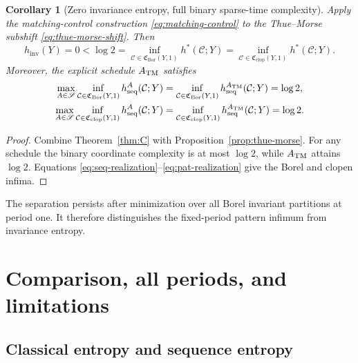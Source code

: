 \documentclass[11pt,reqno]{amsart}
\numberwithin{equation}{section}
\newtheorem{corollary}[theorem]{Corollary}
\theoremstyle{definition}
\newcommand{\C}{\mathcal C}
\newcommand{\hseq}{h_{\mathrm{seq}}}
\newcommand{\hpat}{h^{*}}
\newcommand{\hinv}{h_{\mathrm{inv}}}
\newcommand{\Bor}{\mathrm{Bor}}
\newcommand{\clop}{\mathrm{clop}}
\begin{document}
\begin{corollary}[Zero invariance entropy, full binary sparse-time complexity]
\label{cor:separation}
Apply the matching-control construction \eqref{eq:matching-control} to the
Thue--Morse subshift \eqref{eq:thue-morse-shift}.  Then
\begin{equation}\label{eq:strict-control-separation}
 \hinv(Y)=0
 <\log2
 =\inf_{\C\in\mathfrak C_{\Bor}(Y,1)}\hpat(\C;Y)
 =\inf_{\C\in\mathfrak C_{\clop}(Y,1)}\hpat(\C;Y).
\end{equation}
Moreover, the explicit schedule $A_{\rm TM}$ satisfies
\begin{align}
 \max_{A\in\mathscr S}\inf_{\C\in\mathfrak C_{\Bor}(Y,1)}
 \hseq^A(\C;Y)
 &=\inf_{\C\in\mathfrak C_{\Bor}(Y,1)}\hseq^{A_{\rm TM}}(\C;Y)
 =\log2,
 \label{eq:TM-Borel-sequence}\\
 \max_{A\in\mathscr S}\inf_{\C\in\mathfrak C_{\clop}(Y,1)}
 \hseq^A(\C;Y)
 &=\inf_{\C\in\mathfrak C_{\clop}(Y,1)}\hseq^{A_{\rm TM}}(\C;Y)
 =\log2.
 \label{eq:TM-clopen-sequence}
\end{align}
\end{corollary}

\begin{proof}
Combine Theorem~\ref{thm:C} with Proposition~\ref{prop:thue-morse}.  For any
schedule the binary coordinate complexity is at most $\log2$, while
$A_{\rm TM}$ attains $\log2$.  Equations
\eqref{eq:seq-realization}--\eqref{eq:pat-realization} give the Borel and
clopen infima.
\end{proof}

The separation persists after minimization over all Borel invariant
partitions at period one. It therefore distinguishes the fixed-period
pattern infimum from invariance entropy.


\section{Comparison, all periods, and limitations}\label{sec:comparison}

\subsection{Classical entropy and sequence entropy}\label{sec:background}
\end{document}
